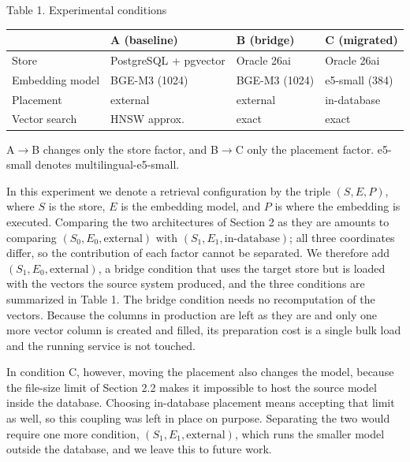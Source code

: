 \documentclass[10pt,a4paper,twocolumn]{article}
\newcommand{\pgsubsec}[1]{\par\vspace{4pt}{\bfseries\fontsize{12}{14}\selectfont #1}\par\nobreak\vspace{1pt}\nobreak}
\begin{document}
\pgsubsec{3.1 Experimental Setup}

\begin{table}[t]
\centering
{\fontsize{8}{9.6}\selectfont Table 1. Experimental conditions}
\vspace{4pt}

\fontsize{6.9}{8.1}\selectfont
\setlength{\tabcolsep}{2pt}
\renewcommand{\arraystretch}{0.95}
\begin{tabular}{@{}l>{\raggedright\arraybackslash}p{1.85cm}>{\raggedright\arraybackslash}p{1.85cm}>{\raggedright\arraybackslash}p{1.85cm}@{}}
\toprule
 & A (baseline) & B (bridge) & C (migrated) \\
\midrule
Store & PostgreSQL + pgvector & Oracle 26ai & Oracle 26ai \\
Embedding model & BGE-M3 (1024) & BGE-M3 (1024) & e5-small (384) \\
Placement & external & external & in-database \\
Vector search & HNSW approx. & exact & exact \\
\bottomrule
\end{tabular}

\vspace{4pt}
{\fontsize{6.9}{8.1}\selectfont A$\rightarrow$B changes only the store factor, and B$\rightarrow$C only the placement factor. e5-small denotes multilingual-e5-small.}
\end{table}

In this experiment we denote a retrieval configuration by the triple $(S, E, P)$, where $S$ is the store, $E$ is the embedding model, and $P$ is where the embedding is executed. Comparing the two architectures of Section 2 as they are amounts to comparing $(S_0, E_0, \text{external})$ with $(S_1, E_1, \text{in-database})$; all three coordinates differ, so the contribution of each factor cannot be separated. We therefore add $(S_1, E_0, \text{external})$, a bridge condition that uses the target store but is loaded with the vectors the source system produced, and the three conditions are summarized in Table 1. The bridge condition needs no recomputation of the vectors. Because the columns in production are left as they are and only one more vector column is created and filled, its preparation cost is a single bulk load and the running service is not touched.

In condition C, however, moving the placement also changes the model, because the file-size limit of Section 2.2 makes it impossible to host the source model inside the database. Choosing in-database placement means accepting that limit as well, so this coupling was left in place on purpose. Separating the two would require one more condition, $(S_1, E_1, \text{external})$, which runs the smaller model outside the database, and we leave this to future work.
\end{document}

